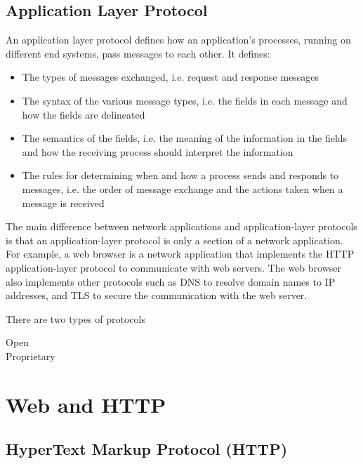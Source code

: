 \documentclass[12pt letter]{report}
\begin{document}
\section{Application Layer Protocol}

An application layer protocol defines how an application's processes,
running on different end systems, pass messages to each other. It defines:
\begin{itemize}
  \item The types of messages exchanged, i.e. request and response messages
  \item The syntax of the various message types, i.e. the fields in
    each message and how the fields are delineated
  \item The semantics of the fields, i.e. the meaning of the
    information in the fields and how the receiving process should
    interpret the information
  \item The rules for determining when and how a process sends and
    responds to messages, i.e. the order of message exchange and the
    actions taken when a message is received
\end{itemize}

The main difference between network applications and
application-layer protocols is that an application-layer protocol is
only a section of a network application. For example, a web browser
is a network application that implements the HTTP application-layer
protocol to communicate with web servers. The web browser also
implements other protocols such as DNS to resolve domain names to IP
addresses, and TLS to secure the communication with the web server.

There are two types of protocols
\begin{description}
  \item[Open]
  \item[Proprietary]
\end{description}

\chapter{Web and HTTP}

\section{HyperText Markup Protocol (HTTP)}

\end{document}
